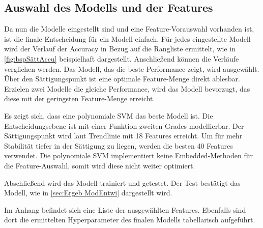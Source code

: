 \subsection{Auswahl des Modells und der Features}\label{sec:Meth ModelSele}
Da nun die Modelle eingestellt sind und eine Feature-Vorauswahl vorhanden ist, ist die finale Entscheidung für ein Modell einfach. Für jedes eingestellte Modell wird der Verlauf der Accuracy in Bezug auf die Rangliste ermittelt, wie in \autoref{fig:bspSättAccu} beispielhaft dargestellt. Anschließend können die Verläufe verglichen werden. Das Modell, das die beste Performance zeigt, wird ausgewählt. Über den Sättigungspunkt ist eine optimale Feature-Menge direkt ablesbar. Erzielen zwei Modelle die gleiche Performance, wird das Modell bevorzugt, das diese mit der geringsten Feature-Menge erreicht. \par

Es zeigt sich, dass eine polynomiale SVM das beste Modell ist. Die Entscheidungsebene ist mit einer Funktion zweiten Grades modellierbar. Der Sättigungspunkt wird laut Trendlinie mit 18 Features erreicht. Um für mehr Stabilität tiefer in der Sättigung zu liegen, werden die besten 40 Features verwendet. Die polynomiale SVM implementiert keine Embedded-Methoden für die Feature-Auswahl, somit wird diese nicht weiter optimiert. \par

Abschließend wird das Modell trainiert und getestet. Der Test bestätigt das Modell, wie in \autoref{sec:Ergeb ModEntwi} dargestellt wird.\par

Im Anhang befindet sich eine Liste der ausgewählten Features. Ebenfalls sind dort die ermittelten Hyperparameter des finalen Modells tabellarisch aufgeführt.